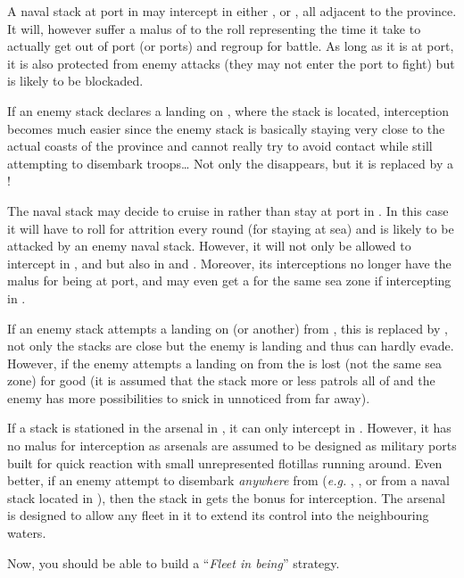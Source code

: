 \begin{exemple}
  A naval stack at port in \provinceCornwall may intercept in either
  \seazoneIrlande, \seazoneCeltique or \seazoneManche, all adjacent to the
  province. It will, however suffer a malus of  to the roll
  representing the time it take to actually get out of port (or ports) and
  regroup for battle. As long as it is at port, it is also protected from
  enemy attacks (they may not enter the port to fight) but is likely to be
  blockaded.

  If an enemy stack declares a landing on \provinceCornwall, where the stack
  is located, interception becomes much easier since the enemy stack is
  basically staying very close to the actual coasts of the province and cannot
  really try to avoid contact while still attempting to disembark troops\ldots
  Not only the  disappears, but it is replaced by a !

  \smallskip

  The naval stack may decide to cruise in \seazoneCeltique rather than stay at
  port in \provinceCornwall. In this case it will have to roll for attrition
  every round (for staying at sea) and is likely to be attacked by an enemy
  naval stack. However, it will not only be allowed to intercept in
  \seazoneIrlande, \seazoneCeltique and \seazoneManche but also in
  \seazoneGascogne and \seazoneRockall. Moreover, its interceptions no longer
  have the  malus for being at port, and may even get a 
  for the same sea zone if intercepting in \seazoneCeltique.

  If an enemy stack attempts a landing on \provinceCornwall (or another) from
  \seazoneCeltique, this  is replaced by , not only the
  stacks are close but the enemy is landing and thus can hardly
  evade. However, if the enemy attempts a landing on \provinceCornwall from
  \seazoneManche the  is lost (not the same sea zone) for good (it
  is assumed that the stack more or less patrols all of \seazoneCeltique and
  the enemy has more possibilities to snick in unnoticed from far away).

  \smallskip

  If a stack is stationed in the \villePortsmouth arsenal in
  , it can only intercept in \seazoneManche. However, it has
  no malus for interception as arsenals are assumed to be designed as military
  ports built for quick reaction with small unrepresented flotillas running
  around. Even better, if an enemy attempt to disembark \emph{anywhere} from
  \seazoneManche (\emph{e.g.} \provinceWessex, \provinceNormandie,
  \provincePicardie or \provinceKent from a naval stack located in
  \seazoneManche), then the stack in \villePortsmouth gets the 
  bonus for interception. The arsenal is designed to allow any fleet in it to
  extend its control into the neighbouring waters.

  \smallskip

  Now, you should be able to build a ``\emph{Fleet in being}'' strategy.
\end{exemple}

